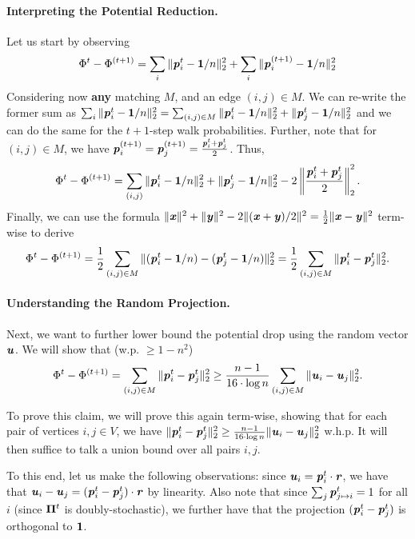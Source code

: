 \paragraph{Interpreting the Potential Reduction.} Let us start by observing 
\begin{align*}
     \Phi^{t} - \Phi^{(t+1)} = \sum_{i} \|\boldsymbol{\mathit{p}}_{i}^t -\boldsymbol{1}/n\|_2^2 + \sum_{i} \|\boldsymbol{\mathit{p}}_{i}^{(t+1)} -\boldsymbol{1}/n\|_2^2
\end{align*}
Considering now \textbf{any} matching $M$, and an edge $(i,j) \in M$. We can re-write the former sum as $\sum_{i} \|\boldsymbol{\mathit{p}}_{i}^t -\boldsymbol{1}/n\|_2^2 = \sum_{(i,j) \in M} \|\boldsymbol{\mathit{p}}_{i}^t -\boldsymbol{1}/n\|_2^2 + \|\boldsymbol{\mathit{p}}_{j}^t -\boldsymbol{1}/n\|_2^2$ and we can do the same for the $t+1$-step walk probabilities. Further, note that for $(i,j) \in M$, we have $\boldsymbol{\mathit{p}}_i^{(t+1)} = \boldsymbol{\mathit{p}}_j^{(t+1)} = \frac{\boldsymbol{\mathit{p}}_i^t+ \boldsymbol{\mathit{p}}_j^t}{2}$. Thus,
\begin{align*}
     \Phi^{t} - \Phi^{(t+1)} = \sum_{(i,j)}  \|\boldsymbol{\mathit{p}}_{i}^t -\boldsymbol{1}/n\|_2^2 + \|\boldsymbol{\mathit{p}}_{j}^t -\boldsymbol{1}/n\|_2^2 - 2 \left\|\frac{\boldsymbol{\mathit{p}}_i^t+ \boldsymbol{\mathit{p}}_j^t}{2}\right\|_2^2.
\end{align*}
Finally, we can use the formula $\|\boldsymbol{\mathit{x}}\|^2 + \|\boldsymbol{\mathit{y}}\|^2 - 2 \|(\boldsymbol{\mathit{x}} + \boldsymbol{\mathit{y}})/2\|^2 = \frac{1}{2} \| \boldsymbol{\mathit{x}} - \boldsymbol{\mathit{y}}\|^2$ term-wise to derive 
\begin{align*}
     \Phi^{t} - \Phi^{(t+1)} = \frac{1}{2}\sum_{(i,j) \in M} \|(\boldsymbol{\mathit{p}}_{i}^t -\boldsymbol{1}/n) - (\boldsymbol{\mathit{p}}_{j}^t -\boldsymbol{1}/n)\|_2^2 = \frac{1}{2}\sum_{(i,j) \in M} \|\boldsymbol{\mathit{p}}_{i}^t - \boldsymbol{\mathit{p}}_{j}^t \|_2^2.
\end{align*}

\paragraph{Understanding the Random Projection.} Next, we want to further lower bound the potential drop using the random vector $\boldsymbol{\mathit{u}}$. We will show that (w.p. $\geq 1-n^2$)
\begin{align}\label{eq:cutMatchingAnalysis}
     \Phi^{t} - \Phi^{(t+1)} = \sum_{(i,j) \in M} \|\boldsymbol{\mathit{p}}_{i}^t - \boldsymbol{\mathit{p}}_{j}^t \|_2^2 \geq \frac{n-1}{16 \cdot \log n} \sum_{(i,j) \in M} \|\boldsymbol{\mathit{u}}_i - \boldsymbol{\mathit{u}}_j\|^2_2.
\end{align}

To prove this claim, we will prove this again term-wise, showing that for each pair of vertices $i,j \in V$, we have $\|\boldsymbol{\mathit{p}}_{i}^t - \boldsymbol{\mathit{p}}_{j}^t \|_2^2 \geq \frac{n-1}{16 \cdot \log n} \|\boldsymbol{\mathit{u}}_i - \boldsymbol{\mathit{u}}_j\|^2_2$ w.h.p. It will then suffice to talk a union bound over all pairs $i,j$. 

To this end, let us make the following observations: since $\boldsymbol{\mathit{u}}_i = \boldsymbol{\mathit{p}}_i^t \cdot \boldsymbol{\mathit{r}}$, we have that $\boldsymbol{\mathit{u}}_i - \boldsymbol{\mathit{u}}_j = (\boldsymbol{\mathit{p}}_i^t - \boldsymbol{\mathit{p}}_j^t) \cdot \boldsymbol{\mathit{r}}$ by linearity. Also note that since $\sum_j \boldsymbol{\mathit{p}}_{j \mapsto i}^t = 1$ for all $i$ (since $\boldsymbol{\Pi}^t$ is doubly-stochastic), we further have that the projection $(\boldsymbol{\mathit{p}}_i^t - \boldsymbol{\mathit{p}}_j^t)$ is orthogonal to $\boldsymbol{1}$.

